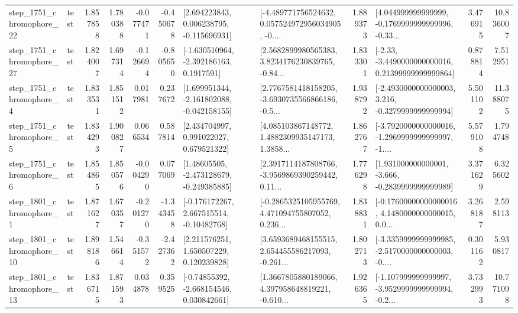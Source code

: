 \begin{tabular}{llrrrrllrlrr}
 step\_1751\_chromophore\_22 &      test &      1.857858 &    1.780388 &     -0.077471 & -0.450678 &    [2.694223843, 0.006238795, -0.115696931] &  [-4.489771756524632, 0.057524972956034905, -0.... &       1.889373 &  [4.044999999999999, -0.1769999999999996, -0.33... &            3.476915 &         10.836007 \\
 step\_1751\_chromophore\_27 &      test &      1.824007 &    1.697314 &     -0.126694 & -0.805650 &     [-1.630510964, -2.392186163, 0.1917591] &  [2.5682899980565383, 3.8234176230839765, -0.84... &       1.833301 &  [-2.33, -3.4490000000000016, 0.21399999999999864] &            0.878814 &          7.512951 \\
  step\_1751\_chromophore\_4 &      test &      1.833531 &    1.851512 &      0.017981 &  0.237672 &   [1.699951344, -2.161802088, -0.042158155] &  [2.7767581418158205, -3.6930735566866186, -0.5... &       1.938792 &  [-2.4930000000000003, 3.216, -0.3279999999999994] &            5.501102 &         11.388075 \\
  step\_1751\_chromophore\_5 &      test &      1.834293 &    1.900827 &      0.066534 &  0.587814 &     [2.434704997, 0.991022027, 0.679521322] &  [4.085103867148772, 1.4882309935147173, 1.3858... &       1.862767 &  [-3.7920000000000016, -1.2969999999999997, -1.... &            5.579108 &          1.794748 \\
  step\_1751\_chromophore\_6 &      test &      1.854865 &    1.850576 &     -0.004290 &  0.077069 &    [1.48605505, -2.473128679, -0.249385885] &  [2.3917114187808766, -3.9569869390259442, 0.11... &       1.776298 &   [1.931000000000001, -3.666, -0.2839999999999989] &            3.371629 &          6.325602 \\
  step\_1801\_chromophore\_1 &      test &      1.871627 &    1.670357 &     -0.201270 & -1.343458 &    [-0.176172267, 2.667515514, -0.10482768] &  [-0.2865325105955769, 4.471094755807052, 0.236... &       1.838831 &  [-0.17600000000000016, 4.1480000000000015, 0.0... &            3.268187 &          2.598113 \\
 step\_1801\_chromophore\_10 &      test &      1.898186 &    1.546614 &     -0.351572 & -2.427362 &     [2.211576251, 1.650507229, 0.120239828] &  [3.6593689468155515, 2.654455586217093, -0.261... &       1.802713 &  [-3.3359999999999985, -2.5170000000000003, -0.... &            0.301162 &          5.930817 \\
 step\_1801\_chromophore\_13 &      test &      1.836715 &    1.871593 &      0.034878 &  0.359525 &    [-0.74855392, -2.668154546, 0.030842661] &  [1.3667805880189066, 4.397958648819221, -0.610... &       1.926365 &  [-1.107999999999997, -3.9529999999999994, -0.2... &            3.732993 &         10.771098 \\

\end{tabular}
